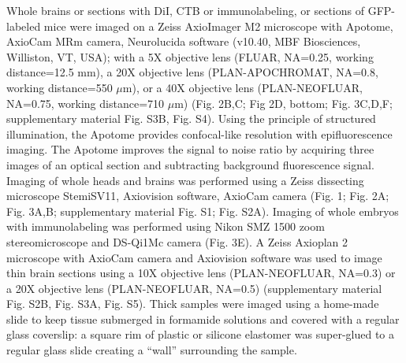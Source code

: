 Whole brains or sections with DiI, CTB or immunolabeling, or sections of GFP-labeled mice were imaged on a Zeiss AxioImager M2 microscope with Apotome, AxioCam MRm camera, Neurolucida software (v10.40, MBF Biosciences, Williston, VT, USA); with a 5X objective lens (FLUAR, NA=0.25, working distance=12.5 mm), a 20X objective lens (PLAN-APOCHROMAT, NA=0.8, working distance=550 $\mu$m), or a 40X objective lens (PLAN-NEOFLUAR, NA=0.75, working distance=710 $\mu$m) (Fig. 2B,C; Fig 2D, bottom; Fig. 3C,D,F; supplementary material Fig. S3B, Fig. S4).
Using the principle of structured illumination, the Apotome provides confocal-like resolution with epifluorescence imaging. The Apotome improves the signal to noise ratio by acquiring three images of an optical section and subtracting background fluorescence signal.
Imaging of whole heads and brains was performed using a Zeiss dissecting microscope StemiSV11, Axiovision software, AxioCam camera (Fig. 1; Fig. 2A; Fig. 3A,B; supplementary material Fig. S1; Fig. S2A).
Imaging of whole embryos with immunolabeling was performed using Nikon SMZ 1500 zoom stereomicroscope and DS-Qi1Mc camera (Fig. 3E).
A Zeiss Axioplan 2 microscope with AxioCam camera and Axiovision software was used to image thin brain sections using a 10X objective lens (PLAN-NEOFLUAR, NA=0.3) or a 20X objective lens (PLAN-NEOFLUAR, NA=0.5) (supplementary material Fig. S2B, Fig. S3A, Fig. S5).
Thick samples were imaged using a home-made slide to keep tissue submerged in formamide solutions and covered with a regular glass coverslip: a square rim of plastic or silicone elastomer was super-glued to a regular glass slide creating a ``wall'' surrounding the sample.